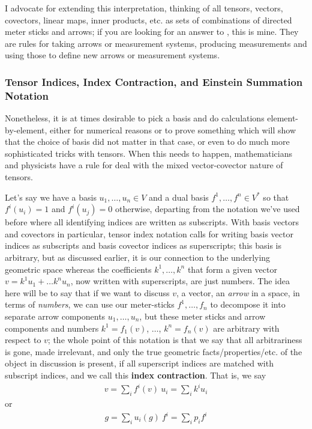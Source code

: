 \documentclass[11pt]{article}
\begin{document}
I advocate for extending this interpretation, thinking of all tensors, vectors, covectors, linear maps, inner products, etc. as sets of combinations of directed meter sticks and arrows; if you are looking for an answer to , this is mine. They are rules for taking arrows or measurement systems, producing measurements and using those to define new arrows or measurement systems.

\subsubsection{Tensor Indices, Index Contraction, and Einstein Summation Notation}

Nonetheless, it is at times desirable to pick a basis and do calculations element-by-element, either for numerical reasons or to prove something which will show that the choice of basis did not matter in that case, or even to do much more sophisticated tricks with tensors. When this needs to happen, mathematicians and physicists have a rule for deal with the mixed vector-covector nature of tensors.

Let's say we have a basis $u_1, \dots, u_n \in V$ and a dual basis $f^1, \dots, f^n \in V^*$ so that $f^i(u_i) = 1$ and $f^i(u_j) = 0$ otherwise, departing from the notation we've used before where all identifying indices are written as subscripts. With basis vectors and covectors in particular, tensor index notation calls for writing basis vector indices as subscripts and basis covector indices as superscripts; this basis is arbitrary, but as discussed earlier, it is our connection to the underlying geometric space whereas the coefficients $k^1, \dots, k^n$ that form a given vector $v = k^1 u_1 + \dots k^n u_n$, now written with superscripts, are just numbers. The idea here will be to say that if we want to discuss $v$, a vector, an \emph{arrow} in a space, in terms of \emph{numbers}, we can use our meter-sticks $f^1, \dots, f_n$ to decompose it into separate arrow components $u_1, \dots, u_n$, but these meter sticks and arrow components and numbers $k^1 = f_1(v)$, $\dots$, $k^n = f_n(v)$ are arbitrary with respect to $v$; the whole point of this notation is that we say that all arbitrariness is gone, made irrelevant, and only the true geometric facts/properties/etc. of the object in discussion is present, if all superscript indices are matched with subscript indices, and we call this \textbf{index contraction}. That is, we say \begin{gather*}
v = \sum_{i} f^i(v) \ u_i = \sum_i k^i u_i
\end{gather*}
or \begin{gather*}
g = \sum_{i} u_i(g) \ f^i = \sum_i p_i f^i
\end{gather*}
\end{document}
